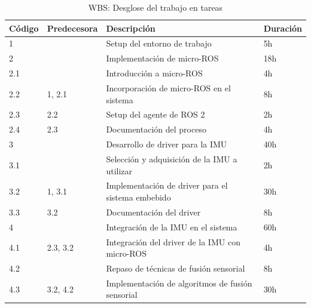 \documentclass[
11pt, %
codirector, %
]{charter}
\begin{document}
\begin{table}[]
\caption{WBS: Desglose del trabajo en tareas}
\label{tab:wbs}
\begin{tabular}{@{}llll@{}}
\toprule
\textbf{Código} & \textbf{Predecesora} & \textbf{Descripción}                               & \textbf{Duración} \\ \midrule
1               &                      & Setup del entorno de trabajo                       & 5h                \\
2               &                      & Implementación de micro-ROS                        & 18h               \\
2.1             &                      & Introducción a micro-ROS                           & 4h                \\
2.2             & 1, 2.1               & Incorporación de micro-ROS en el sistema           & 8h                \\
2.3             & 2.2                  & Setup del agente de ROS 2                          & 2h                \\
2.4             & 2.3                  & Documentación del proceso                          & 4h                \\
3               &                      & Desarrollo de driver para la IMU                   & 40h               \\
3.1             &                      & Selección y adquisición de la IMU a utilizar       & 2h                \\
3.2             & 1, 3.1               & Implementación de driver para el sistema embebido  & 30h               \\
3.3             & 3.2                  & Documentación del driver                           & 8h                \\
4               &                      & Integración de la IMU en el sistema                & 60h               \\
4.1             & 2.3, 3.2             & Integración del driver de la IMU con micro-ROS     & 4h                \\
4.2             &                      & Repaso de técnicas de fusión sensorial             & 8h                \\
4.3             & 3.2, 4.2             & Implementación de algoritmos de fusión sensorial   & 30h               \\

\end{tabular}
\end{table}
\end{document}
